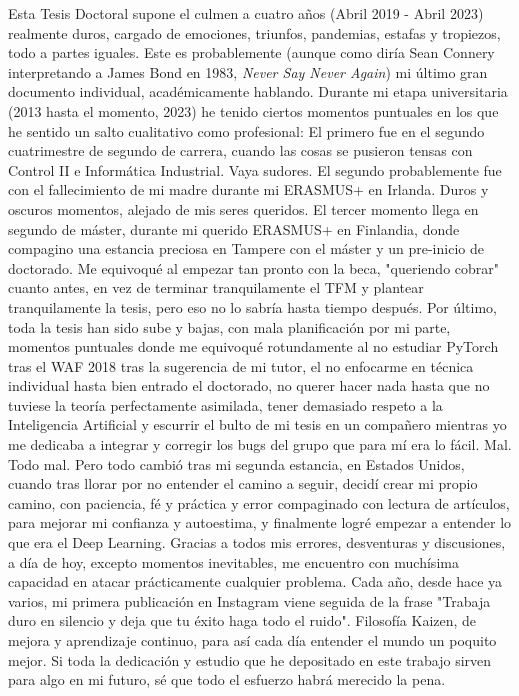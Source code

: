 Esta Tesis Doctoral supone el culmen a cuatro años (Abril 2019 - Abril 2023) realmente duros, cargado de emociones, triunfos, pandemias, estafas y tropiezos, todo a partes iguales. Este es probablemente (aunque como diría Sean Connery interpretando a James Bond en 1983, \textit{Never Say Never Again}) mi último gran documento individual, académicamente hablando. Durante mi etapa universitaria (2013 hasta el momento, 2023) he tenido ciertos momentos puntuales en los que he sentido un salto cualitativo como profesional: El primero fue en el segundo cuatrimestre de segundo de carrera, cuando las cosas se pusieron tensas con Control II e Informática Industrial. Vaya sudores. El segundo probablemente fue con el fallecimiento de mi madre durante mi ERASMUS+ en Irlanda. Duros y oscuros momentos, alejado de mis seres queridos. El tercer momento llega en segundo de máster, durante mi querido ERASMUS+ en Finlandia, donde compagino una estancia preciosa en Tampere con el máster y un pre-inicio de doctorado. Me equivoqué al empezar tan pronto con la beca, "queriendo cobrar" cuanto antes, en vez de terminar tranquilamente el TFM y plantear tranquilamente la tesis, pero eso no lo sabría hasta tiempo después. Por último, toda la tesis han sido sube y bajas, con mala planificación por mi parte, momentos puntuales donde me equivoqué rotundamente al no estudiar PyTorch tras el WAF 2018 tras la sugerencia de mi tutor, el no enfocarme en técnica individual hasta bien entrado el doctorado, no querer hacer nada hasta que no tuviese la teoría perfectamente asimilada, tener demasiado respeto a la Inteligencia Artificial y escurrir el bulto de mi tesis en un compañero mientras yo me dedicaba a integrar y corregir los bugs del grupo que para mí era lo fácil. Mal. Todo mal. Pero todo cambió tras mi segunda estancia, en Estados Unidos, cuando tras llorar por no entender el camino a seguir, decidí crear mi propio camino, con paciencia, fé y práctica y error compaginado con lectura de artículos, para mejorar mi confianza y autoestima, y finalmente logré empezar a entender lo que era el Deep Learning. Gracias a todos mis errores, desventuras y discusiones, a día de hoy, excepto momentos inevitables, me encuentro con muchísima capacidad en atacar prácticamente cualquier problema. Cada año, desde hace ya varios, mi primera publicación en Instagram viene seguida de la frase "Trabaja duro en silencio y deja que tu éxito haga todo el ruido". Filosofía Kaizen, de mejora y aprendizaje continuo, para así cada día entender el mundo un poquito mejor. Si toda la dedicación y estudio que he depositado en este trabajo sirven para algo en mi futuro, sé que todo el esfuerzo habrá merecido la pena.

